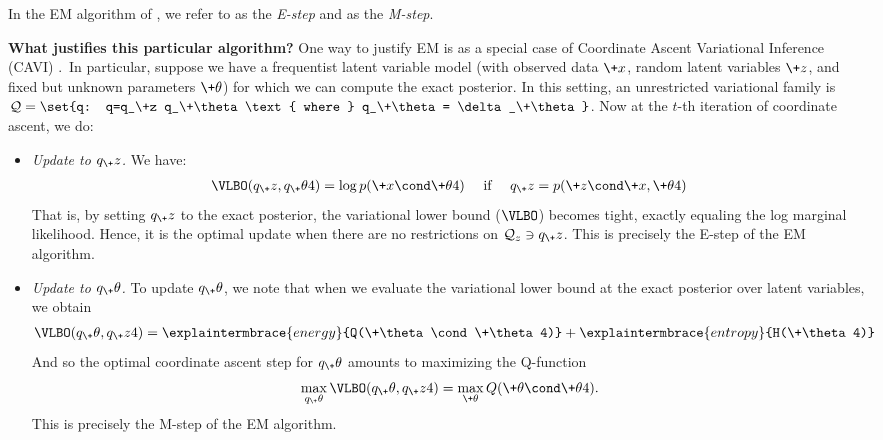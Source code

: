 \documentclass{article} %
\begin{document}
In the EM algorithm of 
, we refer to  as the \textit{E-step} and  as the \textit{M-step}.

\textbf{What justifies this particular algorithm?}  One way to justify EM is as a special case of Coordinate Ascent Variational Inference (CAVI) \cite{wojnowiczXXXXvariational}.\footnotemark~In particular, suppose we have a frequentist latent variable model (with observed data $\+x$, random latent variables $\+z$, and fixed but unknown parameters $\+\theta$) for which we can compute the exact posterior.  In this setting, an unrestricted variational family is $\mathcal{Q} = \set{q: q=q_\+z q_\+\theta \text{ where } q_\+\theta = \delta_\+\theta}$.  Now at the $t$-th iteration of coordinate ascent, we do:


\begin{itemize}
\item \textit{Update to $q_\+z$.} We have:
%
\begin{align}
\VLBO(q_\+z, q_\+\theta^^t) = \log p(\+x \cond \+\theta^^t) \quad \text{ if } \quad 	q_\+z=p(\+z \cond \+x, \+\theta^^t)
\end{align}
%
That is, by setting $q_\+z$ to the exact posterior, the variational lower bound ($\VLBO$) becomes tight, exactly equaling the log marginal likelihood. Hence, it is the optimal update when there are no restrictions on $\mathcal{Q}_z \ni q_\+z$.  This is precisely the E-step of the EM algorithm.

\item \textit{Update to $q_\+\theta$.}	 To update $q_\+\theta$, we note that when we evaluate the variational lower bound at the exact posterior over latent variables, we obtain
%
\begin{align}
\VLBO(q_\+\theta, q_\+z^^t) = \explaintermbrace{energy}{Q(\+\theta \cond \+\theta^^t)} + \explaintermbrace{entropy}{H(\+\theta^^t)}
\end{align}
%
And so the optimal coordinate ascent step for $q_\+\theta$ amounts to maximizing the Q-function
%
\begin{align}
\max_{q_\+\theta} \VLBO(q_\+\theta, q_\+z^^t) = \max_{\+\theta}  Q(\+\theta \cond \+\theta^^t). 
\end{align}
%
This is precisely the M-step of the EM algorithm.
\end{itemize}
%
\end{document}
